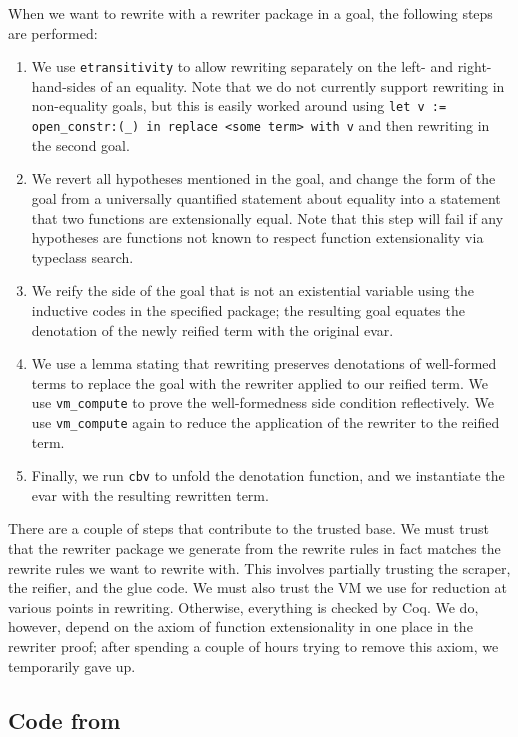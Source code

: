 \begin{subappendices}
When we want to rewrite with a rewriter package in a goal, the following steps are performed:
\begin{enumerate}
    \item
    We use \texttt{etransitivity} to allow rewriting separately on the left- and right-hand-sides of an equality.
    Note that we do not currently support rewriting in non-equality goals, but this is easily worked around using \texttt{let v := open\_constr:(\_) in replace <some term> with v} and then rewriting in the second goal.
    \item
    We revert all hypotheses mentioned in the goal, and change the form of the goal from a universally quantified statement about equality into a statement that two functions are extensionally equal.
    Note that this step will fail if any hypotheses are functions not known to respect function extensionality via typeclass search.
    \item
    We reify the side of the goal that is not an existential variable using the inductive codes in the specified package; the resulting goal equates the denotation of the newly reified term with the original evar.
    \item
    We use a lemma stating that rewriting preserves denotations of well-formed terms to replace the goal with the rewriter applied to our reified term.
    We use \texttt{vm\_compute} to prove the well-formedness side condition reflectively.
    We use \texttt{vm\_compute} again to reduce the application of the rewriter to the reified term.
    \item
    Finally, we run \texttt{cbv} to unfold the denotation function, and we instantiate the evar with the resulting rewritten term.
\end{enumerate}

There are a couple of steps that contribute to the trusted base.
We must trust that the rewriter package we generate from the rewrite rules in fact matches the rewrite rules we want to rewrite with.
This involves partially trusting the scraper, the reifier, and the glue code.
We must also trust the VM we use for reduction at various points in rewriting.
Otherwise, everything is checked by Coq.
We do, however, depend on the axiom of function extensionality in one place in the rewriter proof; after spending a couple of hours trying to remove this axiom, we temporarily gave up.


\subsection{Code from }


\end{subappendices}
